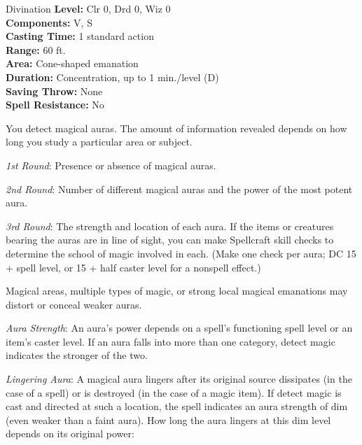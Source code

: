 {Divination}
{
	\textbf{Level:}
	Clr 0, Drd 0, Wiz 0\\
	\textbf{Components:}
	V, S\\
	\textbf{Casting Time:}
	1 standard action\\
	\textbf{Range:}
	60 ft.\\
	\textbf{Area:}
	Cone-shaped emanation\\
	\textbf{Duration:}
	Concentration, up to 1 min./level (D)\\
	\textbf{Saving Throw:}
	None\\
	\textbf{Spell Resistance:}
	No\\
}
{
	You detect magical auras. The amount of information revealed depends on how long you study a particular area or subject.

	\textit{1st Round}:
	Presence or absence of magical auras.

	\textit{2nd Round}:
	Number of different magical auras and the power of the most potent aura.

	\textit{3rd Round}:
	The strength and location of each aura. If the items or creatures bearing the auras are in line of sight, you can make Spellcraft skill checks to determine the school of magic involved in each. (Make one check per aura; DC 15 + spell level, or 15 + half caster level for a nonspell effect.)

	Magical areas, multiple types of magic, or strong local magical emanations may distort or conceal weaker auras.

	\textit{Aura Strength}:
	An aura's power depends on a spell's functioning spell level or an item's caster level. If an aura falls into more than one category, detect magic indicates the stronger of the two.

	\textit{Lingering Aura}:
	A magical aura lingers after its original source dissipates (in the case of a spell) or is destroyed (in the case of a magic item). If detect magic is cast and directed at such a location, the spell indicates an aura strength of dim (even weaker than a faint aura). How long the aura lingers at this dim level depends on its original power:

}
